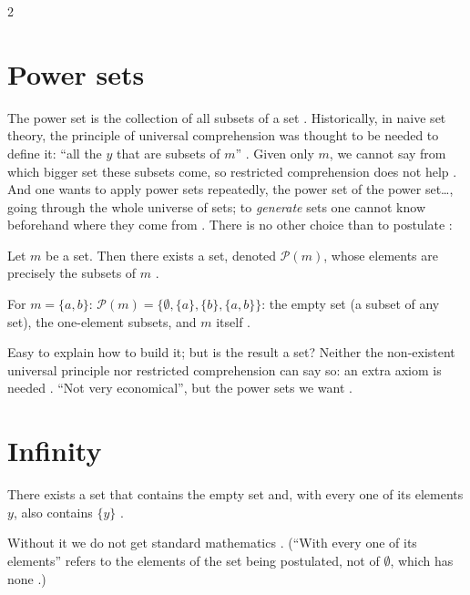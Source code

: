 \begin{paracol}{2}
\section{Power sets}\label{sec:se-power}

The power set is the collection of all subsets of a set . Historically, in naive set
theory, the principle of universal comprehension was thought to be needed to define it: ``all the $y$ that are
subsets of $m$'' . Given only $m$, we cannot say from which bigger set these subsets
come, so restricted comprehension does not help . And one wants to apply power sets repeatedly,
the power set of the power set\dots, going through the whole universe of sets; to \emph{generate} sets one cannot know
beforehand where they come from . There is no other choice than to postulate
:

\begin{definition}\label{ax:se-power}
Let $m$ be a set. Then there exists a set, denoted $\mathcal P(m)$, whose elements are precisely the subsets of $m$
.
\end{definition}

\begin{example}
For $m=\{a,b\}$: $\mathcal P(m)=\bigl\{\emptyset,\{a\},\{b\},\{a,b\}\bigr\}$: the empty set (a subset of any set), the
one-element subsets, and $m$ itself .
\end{example}
Easy to explain how to build it; but is the result a set? Neither the non-existent universal principle nor
restricted comprehension can say so: an extra axiom is needed . ``Not very
economical'', but the power sets we want .

\section{Infinity}\label{sec:se-infinity}

\begin{definition}\label{ax:se-infinity}
There exists a set that contains the empty set and, with every one of its elements $y$, also contains $\{y\}$
.
\end{definition}
Without it we do not get standard mathematics . (``With every one of its elements'' refers to the
elements of the set being postulated, not of $\emptyset$, which has none .)


\end{paracol}
